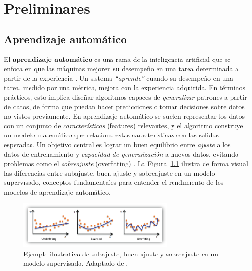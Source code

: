 \documentclass[11pt,spanish,listoffigures,listoftables]{tfgetsinf}
\begin{document}

\chapter{Preliminares}  %
\section{Aprendizaje automático}
El \textbf{aprendizaje automático} es una rama de la inteligencia artificial que se enfoca en que las máquinas mejoren 
su desempeño en una tarea determinada a partir de la experiencia \cite{Mitchell1997}. Un sistema \textit{“aprende”} cuando su desempeño en una tarea, 
medido por una métrica, mejora con la experiencia adquirida. En términos prácticos, esto implica diseñar algoritmos capaces de 
\textit{generalizar} patrones a partir de datos, de forma que puedan hacer predicciones o tomar decisiones sobre datos no vistos 
previamente. En aprendizaje automático se suelen representar los datos con un conjunto de \textit{características} (features) relevantes, y el algoritmo 
construye un modelo matemático que relaciona estas características con las salidas esperadas. Un objetivo central es lograr un buen 
equilibrio entre \textit{ajuste} a los datos de entrenamiento y \textit{capacidad de generalización} a nuevos datos, evitando problemas 
como el \textit{sobreajuste} (overfitting) \cite{Goodfellow2016}. La Figura~\ref{fig:overfitting} ilustra de forma visual las diferencias entre 
subajuste, buen ajuste y sobreajuste en un modelo supervisado, conceptos fundamentales para entender el rendimiento de los modelos de aprendizaje automático.

\begin{figure}[ht]
    \centering
    \includegraphics[width=0.7\textwidth]{under-overfitting.png}
    \caption{Ejemplo ilustrativo de subajuste, buen ajuste y sobreajuste en un modelo supervisado. Adaptado de \cite{awsOverfitting}.}
    \label{fig:overfitting}
\end{figure}
\end{document}
